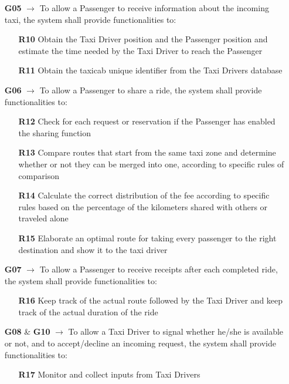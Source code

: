 \begin{itemize}
	\item [\textbf{G05}] $\rightarrow$ To allow a Passenger to receive information about the incoming taxi, the system shall provide functionalities to:
	\begin{itemize}
		\item [\textbf{R10}] Obtain the Taxi Driver position and the Passenger position and estimate the time needed by the Taxi Driver to reach the Passenger
		\item [\textbf{R11}] Obtain the taxicab unique identifier from the Taxi Drivers database
	\end{itemize}
	
	\item [\textbf{G06}] $\rightarrow$ To allow a Passenger to share a ride, the system shall provide functionalities to:
	\begin{itemize}
		\item [\textbf{R12}] Check for each request or reservation if the Passenger has enabled the sharing function
		\item [\textbf{R13}] Compare routes that start from the same taxi zone and determine whether or not they can be merged into one, according to specific rules of comparison
		\item [\textbf{R14}] Calculate the correct distribution of the fee according to specific rules based on the percentage of the kilometers shared with others or traveled alone
		\item [\textbf{R15}] Elaborate an optimal route for taking every passenger to the right destination and show it to the taxi driver
	\end{itemize}

	\item [\textbf{G07}] $\rightarrow$ To allow a Passenger to receive receipts after each completed ride, the system shall provide functionalities to:
	\begin{itemize}
		\item [\textbf{R16}] Keep track of the actual route followed by the Taxi Driver and keep track of the actual duration of the ride
	\end{itemize}
	
	\item [\textbf{G08}] \& \textbf{G10} $\rightarrow$ To allow a Taxi Driver to signal whether he/she is available or not, and to accept/decline an incoming request, the system shall provide functionalities to:
	\begin{itemize}
		\item [\textbf{R17}] Monitor and collect inputs from Taxi Drivers
	\end{itemize}
	

\end{itemize}
